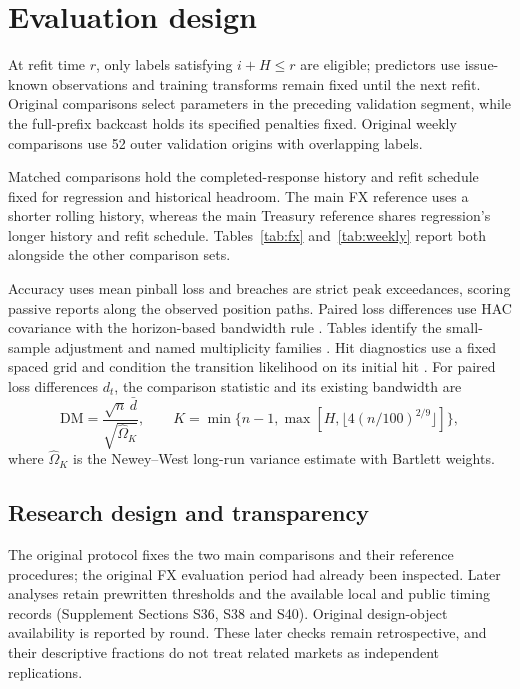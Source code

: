 \documentclass[11pt,a4paper]{article}
\begin{document}
\FloatBarrier

\section{Evaluation design}\label{sec:evaluation}

At refit time \(r\), only labels satisfying \(i+H\le r\) are eligible; predictors use issue-known observations and training transforms remain fixed until the next refit. Original comparisons select parameters in the preceding validation segment, while the full-prefix backcast holds its specified penalties fixed. Original weekly comparisons use 52 outer validation origins with overlapping labels.

Matched comparisons hold the completed-response history and refit schedule fixed for regression and historical headroom. The main FX reference uses a shorter rolling history, whereas the main Treasury reference shares regression's longer history and refit schedule. Tables~\ref{tab:fx} and~\ref{tab:weekly} report both alongside the other comparison sets.

Accuracy uses mean pinball loss and breaches are strict peak exceedances, scoring passive reports along the observed position paths. Paired loss differences use HAC covariance with the horizon-based bandwidth rule \citep{dm1995,nw1987}. Tables identify the small-sample adjustment and named multiplicity families \citep{hln1997,holm1979}. Hit diagnostics use a fixed spaced grid and condition the transition likelihood on its initial hit \citep{kupiec1995,christ1998}.
For paired loss differences \(d_t\), the comparison statistic and its existing bandwidth are
\[
\mathrm{DM}=\frac{\sqrt n\,\bar d}{\sqrt{\widehat\Omega_K}},\qquad
K=\min\{n-1,\max[H,\lfloor4(n/100)^{2/9}\rfloor]\},
\]
where \(\widehat\Omega_K\) is the Newey--West long-run variance estimate with Bartlett weights.


\subsection{Research design and transparency}

The original protocol fixes the two main comparisons and their reference procedures; the original FX evaluation period had already been inspected. Later analyses retain prewritten thresholds and the available local and public timing records (Supplement Sections S36, S38 and S40). Original design-object availability is reported by round. These later checks remain retrospective, and their descriptive fractions do not treat related markets as independent replications.
\end{document}

